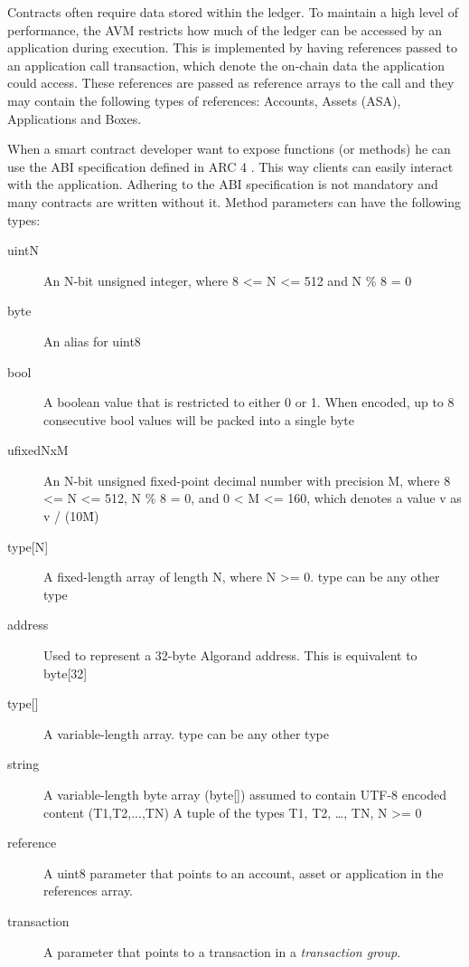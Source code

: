 Contracts often require data stored within the ledger. To maintain a high level of performance, the \ac{AVM} restricts how much of the ledger can be accessed by an application during execution. This is implemented by having references passed to an application call transaction, which denote the on-chain data the application could access. These references are passed as reference arrays to the call and they may contain the following types of references: Accounts, Assets (\ac{ASA}), Applications and Boxes.

When a smart contract developer want to expose functions (or methods) he can use the \ac{ABI} specification defined in \ac{ARC} 4 \cite{noauthor_arcsarcsarc-0004md_nodate}. This way clients can easily interact with the application. Adhering to the \ac{ABI} specification is not mandatory and many contracts are written without it. Method parameters can have the following types:
\begin{description}
    \item[uintN] An N-bit unsigned integer, where 8 <= N <= 512 and N \% 8 = 0
    \item[byte]	An alias for uint8
    \item[bool]	A boolean value that is restricted to either 0 or 1. When encoded, up to 8 consecutive bool values will be packed into a single byte
    \item[ufixedNxM] An N-bit unsigned fixed-point decimal number with precision M, where 8 <= N <= 512, N \% 8 = 0, and 0 < M <= 160, which denotes a value v as v / (10\^M)

        \item[{type[N]}] A fixed-length array of length N, where N >= 0. type can be any other type
    \item[address] Used to represent a 32-byte Algorand address. This is equivalent to byte[32]

        \item[{type[]}] A variable-length array. type can be any other type
    \item[string] A variable-length byte array (byte[]) assumed to contain UTF-8 encoded content
        (T1,T2,...,TN) A tuple of the types T1, T2, …, TN, N >= 0
    \item[reference] A uint8 parameter that points to an account, asset or application in the references array.
    \item[transaction] A parameter that points to a transaction in a \textit{transaction group}.
\end{description}

